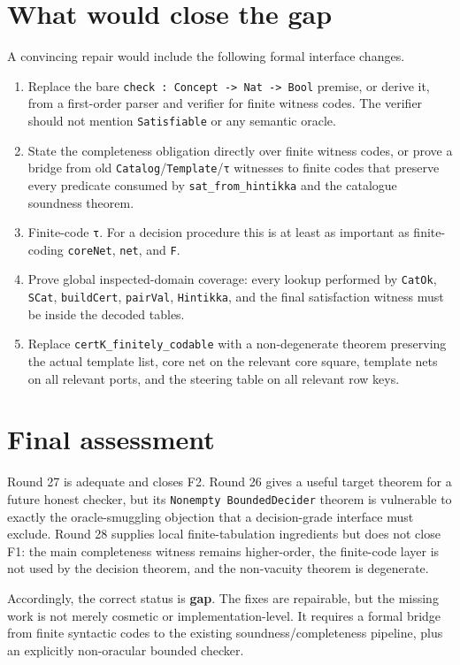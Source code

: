 \documentclass[11pt]{article}
\begin{document}
\section{What would close the gap}

A convincing repair would include the following formal interface changes.

\begin{enumerate}
\item Replace the bare \texttt{check : Concept -> Nat -> Bool} premise, or derive it, from a first-order parser and verifier for finite witness codes. The verifier should not mention \texttt{Satisfiable} or any semantic oracle.
\item State the completeness obligation directly over finite witness codes, or prove a bridge from old \texttt{Catalog}/\texttt{Template}/\texttt{τ} witnesses to finite codes that preserve every predicate consumed by \texttt{sat\_from\_hintikka} and the catalogue soundness theorem.
\item Finite-code \texttt{τ}. For a decision procedure this is at least as important as finite-coding \texttt{coreNet}, \texttt{net}, and \texttt{F}.
\item Prove global inspected-domain coverage: every lookup performed by \texttt{CatOk}, \texttt{SCat}, \texttt{buildCert}, \texttt{pairVal}, \texttt{Hintikka}, and the final satisfaction witness must be inside the decoded tables.
\item Replace \texttt{certK\_finitely\_codable} with a non-degenerate theorem preserving the actual template list, core net on the relevant core square, template nets on all relevant ports, and the steering table on all relevant row keys.
\end{enumerate}

\section{Final assessment}

Round 27 is adequate and closes F2. Round 26 gives a useful target theorem for a future honest checker, but its \texttt{Nonempty BoundedDecider} theorem is vulnerable to exactly the oracle-smuggling objection that a decision-grade interface must exclude. Round 28 supplies local finite-tabulation ingredients but does not close F1: the main completeness witness remains higher-order, the finite-code layer is not used by the decision theorem, and the non-vacuity theorem is degenerate.

Accordingly, the correct status is \textbf{gap}. The fixes are repairable, but the missing work is not merely cosmetic or implementation-level. It requires a formal bridge from finite syntactic codes to the existing soundness/completeness pipeline, plus an explicitly non-oracular bounded checker.
\end{document}
